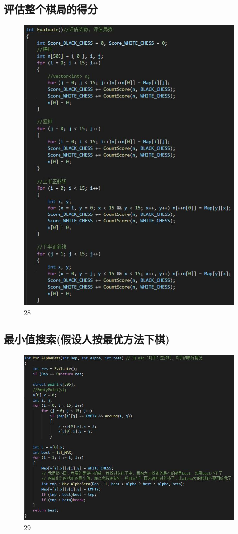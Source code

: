 \documentclass[UTF8]{ctexart}
\begin{document}
\subsection{评估整个棋局的得分}
\begin{figure}[H]
    \centering
    \includegraphics[scale=1.0]{27.jpg}
\caption{28}
\end{figure}
\subsection{最小值搜索(假设人按最优方法下棋)}
\begin{figure}[H]
    \centering
    \includegraphics[scale=0.8]{28.jpg}
\caption{29}
\end{figure}
\end{document}
